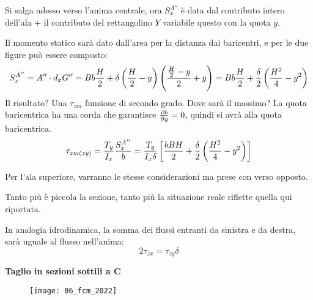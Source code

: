 \documentclass{article}
\begin{document}
\begin{adjustwidth}{2in}{} 

		Si salga adesso verso l'anima centrale, ora $ S_x^{A''} $ è data dal contributo intero dell'ala + il contributo del rettangolino $Y$ variabile questo con la quota $y$. \newline

		Il momento statico sarà dato dall'area per la distanza dai baricentri, e per le due figure può essere composto: 
		\[S_x^{A''}= A'' \cdot d_xG'' = Bb{H\over2} + \delta\left({H\over2} -y \right)\left({{H\over2} - y \over2} + y\right) = Bb{H\over2} + {\delta\over2}\left({H^2\over4}-y^2\right)\]
		Il risultato? Una $\tau_{zm}$ funzione di secondo grado. Dove sarà il massimo? La quota baricentrica ha una corda che garantisce \({\partial b\over \partial y} = 0\), quindi si avrà alla quota baricentrica. 
		\[ \tau_{zm(zy)}= \dfrac{T_y}{I_x}\dfrac{S_x^{A''}}{b} = \dfrac{T_y}{I_x\delta}\left[    \dfrac{bBH}{2} + {\delta\over2}\left({H^2\over4}-y^2\right) \right] \]

		Per l'ala superiore, varranno le stesse considerazioni ma prese con verso opposto. 		

		Tanto più è piccola la sezione, tanto più la situazione reale riflette quella qui riportata.  
		
		In analogia idrodinamica, la somma dei flussi entranti da sinistra e da destra, sarà uguale al flusso nell'anima:
		\[2\tau_{zx} = \tau_{zy}\delta\] 
		
		\textbf{{\Large Taglio in sezioni sottili a C}} \newline
\end{adjustwidth}
\begin{figure}[H]
\texttt{[image: 06\_fcm\_2022]}
\end{figure}
\end{document}
